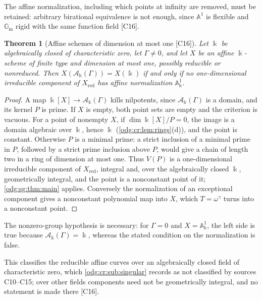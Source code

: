 \documentclass[11pt,oneside]{article}
\numberwithin{equation}{section}
\newtheorem{theorem}{Theorem}[section]
\theoremstyle{definition}
\theoremstyle{remark}
\newcommand{\src}[1]{\textup{\textsf{\small[#1]}}}
\newcommand{\crA}{\mathcal A_\Bbbk(\Gamma)}
\newcommand{\Aff}{\mathbb A}
\newcommand{\Gm}{\mathbb G_{\mathrm m}}
\begin{document}
The affine normalization, including which points at infinity are removed, must be
retained: arbitrary birational equivalence is not enough, since $\Aff^1$ is flexible and
$\Gm$ rigid with the same function field \src{C16}.

\begin{theorem}[Affine schemes of dimension at most one \src{C16}]\label{odg:sg:thm:allcurves}
Let $\Bbbk$ be algebraically closed of characteristic zero, let $\Gamma\ne0$,
and let $X$ be an affine $\Bbbk$-scheme of finite type and dimension at most one,
possibly reducible or nonreduced. Then
$X(\crA)=X(\Bbbk)$ if and only if no one-dimensional irreducible component of
$X_{\mathrm{red}}$ has affine normalization $\Aff^1_\Bbbk$.
\end{theorem}
\begin{proof}
A map $\Bbbk[X]\to\crA$ kills nilpotents, since $\crA$ is a domain, and its kernel $P$ is
prime. If $X$ is empty, both point sets are empty and the criterion is
vacuous. For a point of nonempty $X$, if $\dim\Bbbk[X]/P=0$, the image is a domain algebraic over $\Bbbk$, hence $\Bbbk$
(\cref{odg:cr:lem:rings}(d)), and the point is constant. Otherwise $P$ is a minimal prime: a strict inclusion of a minimal prime
in $P$, followed by a strict prime inclusion above $P$, would give a chain
of length two in a ring of dimension at most one. Thus
$V(P)$ is a one-dimensional irreducible component of $X_{\mathrm{red}}$, integral and,
over the algebraically closed $\Bbbk$, geometrically integral, and the point is a
nonconstant point of it; \cref{odg:sg:thm:main} applies. Conversely the normalization of
an exceptional component gives a nonconstant polynomial map into $X$, which
$T=\omega^\gamma$ turns into a nonconstant point.
\end{proof}

The nonzero-group hypothesis is necessary: for $\Gamma=0$ and
$X=\Aff^1_\Bbbk$, the left side is true because $\crA=\Bbbk$, whereas
the stated condition on the normalization is false.

This classifies the reducible affine curves over an algebraically closed field of
characteristic zero, which \cref{odg:cr:sub:singular} records as not classified by sources
C10--C15; over other fields components need not be geometrically integral, and no
statement is made there \src{C16}.
\end{document}
